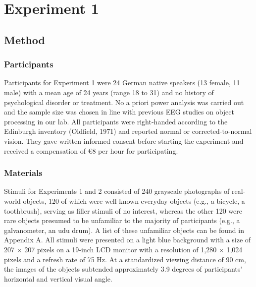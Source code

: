 \documentclass[
  english,
  doc,12pt,twoside,floatsintext]{apa7}
\begin{document}
\hypertarget{experiment-1}{%
\section{Experiment 1}\label{experiment-1}}

\hypertarget{method}{%
\subsection{Method}\label{method}}

\hypertarget{participants}{%
\subsubsection{Participants}\label{participants}}

Participants for Experiment 1 were 24 German native speakers (13 female, 11 male) with a mean age of 24 years (range 18 to 31) and no history of psychological disorder or treatment. No a priori power analysis was carried out and the sample size was chosen in line with previous EEG studies on object processing in our lab. All participants were right-handed according to the Edinburgh inventory (Oldfield, 1971) and reported normal or corrected-to-normal vision. They gave written informed consent before starting the experiment and received a compensation of €8 per hour for participating.

\hypertarget{materials}{%
\subsubsection{Materials}\label{materials}}

Stimuli for Experiments 1 and 2 consisted of 240 grayscale photographs of real-world objects, 120 of which were well-known everyday objects (e.g., a bicycle, a toothbrush), serving as filler stimuli of no interest, whereas the other 120 were rare objects presumed to be unfamiliar to the majority of participants (e.g., a galvanometer, an udu drum). A list of these unfamiliar objects can be found in Appendix A. All stimuli were presented on a light blue background with a size of 207 × 207 pixels on a 19-inch LCD monitor with a resolution of 1,280 × 1,024 pixels and a refresh rate of 75 Hz. At a standardized viewing distance of 90 cm, the images of the objects subtended approximately 3.9 degrees of participants' horizontal and vertical visual angle.
\end{document}
